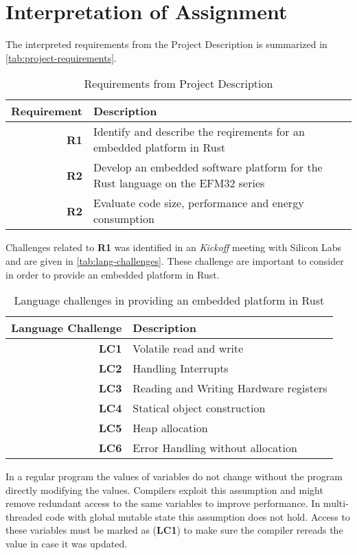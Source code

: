 \section{Interpretation of Assignment}

The interpreted requirements from the Project Description is summarized in \autoref{tab:project-requirements}.

\begin{table}[H]
  \centering
  \begin{tabular}{r | p{8cm}}
    \textbf{Requirement} & \textbf{Description} \\
    \hline
    \textbf{R1} & Identify and describe the reqirements for an embedded platform in Rust \\
    \textbf{R2} & Develop an embedded software platform for the Rust language on the EFM32 series \\
    \textbf{R2} & Evaluate code size, performance and energy consumption \\
    \hline
  \end{tabular}
  \caption{Requirements from Project Description}
  \label{tab:project-requirements}
\end{table}

Challenges related to \textbf{R1} was identified in an \emph{Kickoff} meeting with Silicon Labs and are given in \autoref{tab:lang-challenges}.
These challenge are important to consider in order to provide an embedded platform in Rust.

\begin{table}[H]
  \centering
  \begin{tabular}{r | l}
    \textbf{Language Challenge} & \textbf{Description} \\
    \hline
    \textbf{LC1} & Volatile read and write \\
    \textbf{LC2} & Handling Interrupts \\
    \textbf{LC3} & Reading and Writing Hardware registers \\
    \textbf{LC4} & Statical object construction \\
    \textbf{LC5} & Heap allocation \\
    \textbf{LC6} & Error Handling without allocation \\
    \hline
  \end{tabular}
  \caption{Language challenges in providing an embedded platform in Rust}
  \label{tab:lang-challenges}
\end{table}

In a regular program the values of variables do not change without the program directly modifying the values.
Compilers exploit this assumption and might remove redundant access to the same variables to improve performance.
In multi-threaded code with global mutable state this assumption does not hold.
Access to these variables must be marked as  (\textbf{LC1}) to make sure the compiler rereads the value in case it was updated.

